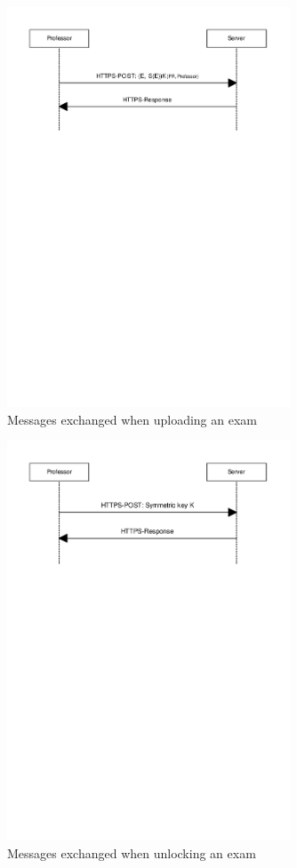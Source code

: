 \documentclass{article}
\begin{document}
\begin{figure}
  \begin{center}
  \includegraphics[width=0.75\textwidth]{images/upload_exam.pdf}
  \caption{Messages exchanged when uploading an exam}
  \label{fig:upload-exam}
  \end{center}
\end{figure}

\begin{figure}
  \begin{center}
  \includegraphics[width=0.75\textwidth]{images/unlock_exam.pdf}
  \caption{Messages exchanged when unlocking an exam}
  \label{fig:unlock-exam}
  \end{center}
\end{figure}
\end{document}
